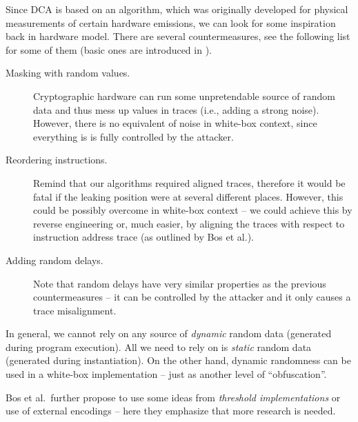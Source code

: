 Since DCA is based on an algorithm, which was originally developed for physical measurements of certain hardware emissions, we can look for some inspiration back in hardware model. There are several countermeasures, see the following list for some of them (basic ones are introduced in \cite{chari1999towards,goubin1999des}).
\begin{description}
	\item[Masking with random values.] Cryptographic hardware can run some unpretendable source of random data and thus mess up values in traces (i.e., adding a strong noise). However, there is no equivalent of noise in white-box context, since everything is is fully controlled by the attacker.
	\item[Reordering instructions.] Remind that our algorithms required aligned traces, therefore it would be fatal if the leaking position were at several different places. However, this could be possibly overcome in white-box context -- we could achieve this by reverse engineering or, much easier, by aligning the traces with respect to instruction address trace (as outlined by Bos et al.).
	\item[Adding random delays.] Note that random delays have very similar properties as the previous countermeasures -- it can be controlled by the attacker and it only causes a trace misalignment.
\end{description}
In general, we cannot rely on any source of {\em dynamic} random data (generated during program execution). All we need to rely on is {\em static} random data (generated during instantiation). On the other hand, dynamic randomness can be used in a white-box implementation -- just as another level of ``obfuscation''.

Bos et al.\ further propose to use some ideas from {\em threshold implementations} \cite{nikova2006threshold} or use of external encodings -- here they emphasize that more research is needed.
